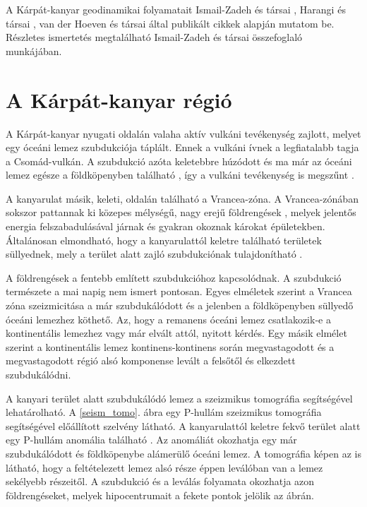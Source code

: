 \documentclass[12pt]{report}
\numberwithin{equation}{section}
\numberwithin{table}{section}
\numberwithin{figure}{section}
\begin{document}
A Kárpát-kanyar geodinamikai folyamatait Ismail-Zadeh és társai \cite{Matenco2012}, Harangi és társai \cite{Harangi2010, Harangi2014}, van der Hoeven és társai \cite{Hoeven2005} által publikált cikkek alapján mutatom be. Részletes ismertetés megtalálható Ismail-Zadeh és társai \cite{Matenco2012} összefoglaló munkájában.

\section{A Kárpát-kanyar régió}

A Kárpát-kanyar nyugati oldalán valaha aktív vulkáni tevékenység zajlott, melyet egy óceáni lemez szubdukciója táplált. Ennek a vulkáni ívnek a legfiatalabb tagja a Csomád-vulkán. A szubdukció azóta keletebbre húzódott  és ma már az óceáni lemez egésze a földköpenyben található \cite{Matenco2012}, így a vulkáni tevékenység is megszűnt \cite{Harangi2010}.

A kanyarulat másik, keleti, oldalán található a Vrancea-zóna. A Vrancea-zónában sokszor pattannak ki közepes mélységű, nagy erejű földrengések \cite{Matenco2012}, melyek jelentős energia felszabadulásával járnak és gyakran okoznak károkat épületekben. Általánosan elmondható, hogy a kanyarulattól keletre található területek süllyednek, mely a terület alatt zajló szubdukciónak tulajdonítható \cite{Hoeven2005}.

A földrengések a fentebb említett szubdukcióhoz kapcsolódnak. A szubdukció természete a mai napig nem ismert pontosan. Egyes elméletek szerint a Vrancea zóna szeizmicitása a már szubdukálódott és a jelenben a földköpenyben süllyedő óceáni lemezhez köthető. Az, hogy a remanens óceáni lemez csatlakozik-e a kontinentális lemezhez vagy már elvált attól, nyitott kérdés. Egy másik elmélet szerint a kontinentális lemez kontinens-kontinens során megvastagodott és a megvastagodott régió alsó komponense levált a felsőtől és elkezdett szubdukálódni. \cite{Matenco2012}

A kanyari terület alatt szubdukálódó lemez a szeizmikus tomográfia segítségével lehatárolható. A \ref{seism_tomo}. ábra egy P-hullám szeizmikus tomográfia segítségével előállított szelvény látható. A kanyarulattól keletre fekvő terület alatt egy P-hullám anomália található \cite{Matenco2012}. Az anomáliát okozhatja egy már szubdukálódott és földköpenybe alámerülő óceáni lemez. A tomográfia képen az is látható, hogy a feltételezett lemez alsó része éppen leválóban van a lemez sekélyebb részeitől. A szubdukció és a leválás folyamata okozhatja azon földrengéseket, melyek hipocentrumait a fekete pontok jelölik az ábrán.
\end{document}
